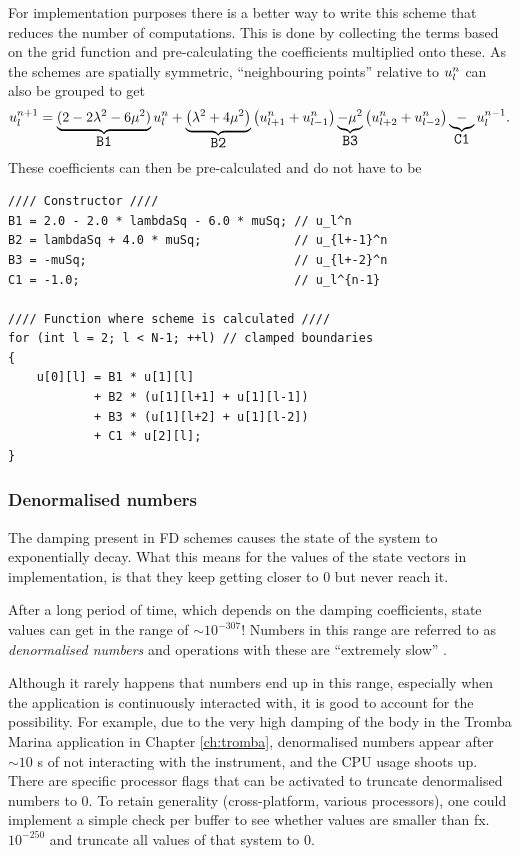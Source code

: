 For implementation purposes there is a better way to write this scheme that reduces the number of computations. This is done by collecting the terms based on the grid function and pre-calculating the coefficients multiplied onto these. As the schemes are spatially symmetric, ``neighbouring points'' relative to $u_l^n$ can also be grouped to get
\def\semilarge{\fontsize{11}{11.6}\selectfont}
\begin{equation}
    u_l^{n+1} = \underbrace{(2 - 2\lambda^2 - 6\mu^2)}_{\texttt{\semilarge B1}}\uln  + \underbrace{\left(\lambda^2 + 4\mu^2\right)}_{\texttt{\semilarge B2}}\left(u_{l+1}^n+u_{l-1}^n\right)\underbrace{-\mu^2}_{\texttt{\semilarge B3}} \left(u_{l+2}^n+u_{l-2}^n\right) \underbrace{-}_{\texttt{\semilarge C1}} u_l^{n-1}.
\end{equation}
These coefficients can then be pre-calculated and do not have to be 

\begin{lstlisting}[caption=Precalculation]
//// Constructor ////
B1 = 2.0 - 2.0 * lambdaSq - 6.0 * muSq; // u_l^n
B2 = lambdaSq + 4.0 * muSq;             // u_{l+-1}^n
B3 = -muSq;                             // u_{l+-2}^n
C1 = -1.0;                              // u_l^{n-1}

//// Function where scheme is calculated ////
for (int l = 2; l < N-1; ++l) // clamped boundaries
{
    u[0][l] = B1 * u[1][l]
            + B2 * (u[1][l+1] + u[1][l-1]) 
            + B3 * (u[1][l+2] + u[1][l-2])
            + C1 * u[2][l];
}
\end{lstlisting}

\subsubsection{Denormalised numbers}
The damping present in FD schemes causes the state of the system to exponentially decay. What this means for the values of the state vectors in implementation, is that they keep getting closer to $0$ but never reach it. 

After a long period of time, which depends on the damping coefficients, state values can get in the range of $\sim 10^{-307}$! Numbers in this range are referred to as \textit{denormalised numbers} and operations with these are ``extremely slow'' \cite{CPPdenormalised}.

Although it rarely happens that numbers end up in this range, especially when the application is continuously interacted with, it is good to account for the possibility. For example, due to the very high damping of the body in the Tromba Marina application in Chapter \ref{ch:tromba}, denormalised numbers appear after $\sim 10$ s of not interacting with the instrument, and the CPU usage shoots up. There are specific processor flags that can be activated to truncate denormalised numbers to 0. To retain generality (cross-platform, various processors), one could implement a simple check per buffer to see whether values are smaller than fx. $10^{-250}$ and truncate all values of that system to $0$. 

